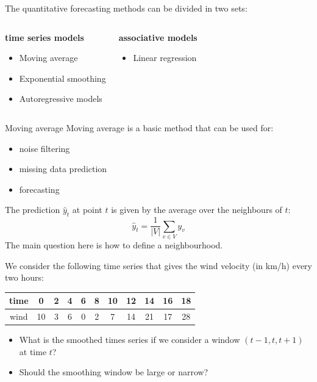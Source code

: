 \documentclass{beamer}
\begin{document}
\begin{frame}{}
The quantitative forecasting methods can be divided in two sets:
\begin{columns}[t]
\column{5cm}
\begin{center}
	\textbf{time series models}\\
	\begin{itemize}
		\item Moving average
		\item Exponential smoothing
		\item Autoregressive models
	\end{itemize}
\end{center}
\column{5cm}
\begin{center}
	\textbf{associative models}\\
	\begin{itemize}
		\item Linear regression
	\end{itemize}
\end{center}
\end{columns}
\end{frame}

\begin{frame}{Moving average}
Moving average is a basic method that can be used for:
\begin{itemize}
	\item noise filtering
	\item missing data prediction
	\item forecasting
\end{itemize}
\vspace{5mm}
The prediction $\hat{y}_t$ at point $t$ is given by the average over the neighbours of $t$:
$$\hat{y}_t = \frac{1}{|V|} \sum_{v \in V} y_v $$
The main question here is how to define a neighbourhood. 
\end{frame}

\begin{frame}{}
\begin{example}[Denoising]
We consider the following time series that gives the wind velocity (in km/h) every two hours:\\
\begin{center}
  \begin{tabular}{|c|cccccccccc|}
  \hline
  time & 0 	& 2 	& 4 	 & 6 	& 8 	& 10 	& 12 	& 14 	& 16 	& 18 	\\ \hline
  wind & 10	& 3 	& 6 	 & 0 	& 2 	& 7 	& 14 	& 21 	& 17 	& 28 	\\ \hline
  \end{tabular}
\end{center}
\begin{itemize}
	\item What is the smoothed times series if we consider a window $(t-1,t,t+1)$ at time $t$?
	\item Should the smoothing window be large or narrow?
\end{itemize}
\end{example}
\end{frame}
\end{document}
